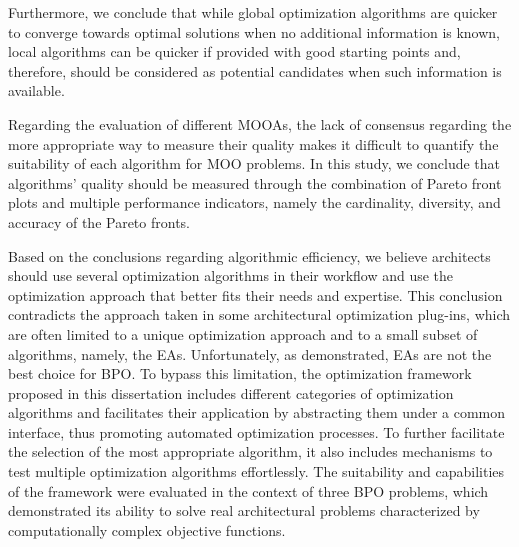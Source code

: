 Furthermore, we conclude that while global optimization algorithms are quicker to converge towards optimal solutions when no additional information is known, local algorithms can be quicker if provided with good starting points and, therefore, should be considered as potential candidates when such information is available.

Regarding the evaluation of different \acp{MOOA}, the lack of consensus regarding the more appropriate way to measure their quality makes it difficult to quantify the suitability of each algorithm for \ac{MOO} problems. In this study, we conclude that algorithms' quality should be measured through the combination of Pareto front plots and multiple performance indicators, namely the cardinality, diversity, and accuracy of the Pareto fronts. %
 
Based on the conclusions regarding algorithmic efficiency, we believe architects should use several optimization algorithms in their workflow and use the optimization approach that better fits their needs and expertise. This conclusion contradicts the approach taken in some architectural optimization plug-ins, which are often limited to a unique optimization approach and to a small subset of algorithms, namely, the \acp{EA}. Unfortunately, as demonstrated, \acp{EA} are not the best choice for \ac{BPO}. To bypass this limitation, the optimization framework proposed in this dissertation includes different categories of optimization algorithms and facilitates their application by abstracting them under a common interface, thus promoting automated optimization processes. To further facilitate the selection of the most appropriate algorithm, it also includes mechanisms to test multiple optimization algorithms effortlessly. The suitability and capabilities of the framework were evaluated in the context of three \ac{BPO} problems, which demonstrated its ability to solve real architectural problems characterized by computationally complex objective functions.

